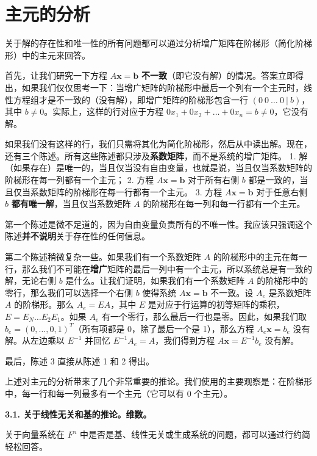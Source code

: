 \section{主元的分析}

关于解的存在性和唯一性的所有问题都可以通过分析增广矩阵在阶梯形（简化阶梯形）中的主元来回答。

首先，让我们研究一下方程 $A \mathbf{x} = \mathbf{b}$ \textbf{不一致}（即它没有解）的情况。答案立即得出，如果我们仅仅思考一下：当增广矩阵的阶梯形中最后一个列有一个主元时，线性方程组才是不一致的（没有解），即增广矩阵的阶梯形包含一行 $(0 \ 0 \ \dots \ 0 \ | \ b)$，其中 $b \neq 0$。实际上，这样的行对应于方程 $0 x_1 + 0 x_2 + \dots + 0 x_n = b \neq 0$，它没有解。

如果我们没有这样的行，我们只需将其化为简化阶梯形，然后从中读出解。现在，还有三个陈述。所有这些陈述都只涉及\textbf{系数矩阵}，而不是系统的增广矩阵。
1. 解（如果存在）是唯一的，当且仅当没有自由变量，也就是说，当且仅当系数矩阵的阶梯形在每一列都有一个主元；
2. 方程 $A \mathbf{x} = \mathbf{b}$ 对于所有右侧 $b$ 都是一致的，当且仅当系数矩阵的阶梯形在每一行都有一个主元。
3. 方程 $A \mathbf{x} = \mathbf{b}$ 对于任意右侧 $b$ \textbf{都有唯一解}，当且仅当系数矩阵 $A$ 的阶梯形在每一列和每一行都有一个主元。

第一个陈述是微不足道的，因为自由变量负责所有的不唯一性。我应该只强调这个陈述\textbf{并不说明}关于存在性的任何信息。

第二个陈述稍微复杂一些。如果我们有一个系数矩阵 $A$ 的阶梯形中的主元在每一行，那么我们不可能在\textbf{增广}矩阵的最后一列中有一个主元，所以系统总是有一致的解，无论右侧 $b$ 是什么。让我们证明，如果我们有一个系数矩阵 $A$ 的阶梯形中的零行，那么我们可以选择一个右侧 $b$ 使得系统 $A \mathbf{x} = \mathbf{b}$ 不一致。设 $A_e$ 是系数矩阵 $A$ 的阶梯形。那么 $A_e = EA$，其中 $E$ 是对应于行运算的初等矩阵的乘积，$E = E_N \dots E_2 E_1$。如果 $A_e$ 有一个零行，那么最后一行也是零。因此，如果我们取 $b_e = (0, \dots, 0, 1)^T$（所有项都是 0，除了最后一个是 1），那么方程 $A_e \mathbf{x} = b_e$ 没有解。从左边乘以 $E^{-1}$ 并回忆 $E^{-1} A_e = A$，我们得到方程 $A \mathbf{x} = E^{-1} b_e$ 没有解。

最后，陈述 3 直接从陈述 1 和 2 得出。

上述对主元的分析带来了几个非常重要的推论。我们使用的主要观察是：在阶梯形中，每一行和每一列最多有一个主元（它可以有 0 个主元）。

\textbf{3.1. 关于线性无关和基的推论。维数。}

关于向量系统在 $F^n$ 中是否是基、线性无关或生成系统的问题，都可以通过行约简轻松回答。

